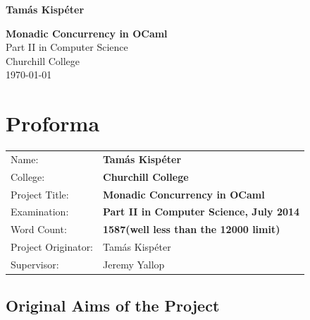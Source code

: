 \documentclass[12pt,twoside,notitlepage]{report}
\theoremstyle{plain}%
\theoremstyle{definition}
\theoremstyle{remark}
\begin{document}





\pagestyle{empty}

\hfill{\LARGE \bf Tam\'as Kisp\'eter}

\vspace*{60mm}
\begin{center}
\Huge
{\bf Monadic Concurrency in OCaml} \\
\vspace*{5mm}
Part II in Computer Science \\
\vspace*{5mm}
Churchill College \\
\vspace*{5mm}
\today  %
\end{center}

\cleardoublepage


\setcounter{page}{1}
\pagestyle{plain}

\chapter*{Proforma}

{\large
\begin{tabular}{ll}
Name:               & \bf Tam\'as Kisp\'eter                     \\
College:            & \bf Churchill College                     \\
Project Title:      & \bf Monadic Concurrency in OCaml \\
Examination:        & \bf Part II in Computer Science, July 2014        \\
Word Count:         & \bf 1587\footnotemark[1]
(well less than the 12000 limit) \\
Project Originator: & Tam\'as Kisp\'eter                    \\
Supervisor:         & Jeremy Yallop                    \\ 
\end{tabular}
}


\section*{Original Aims of the Project}
\end{document}

